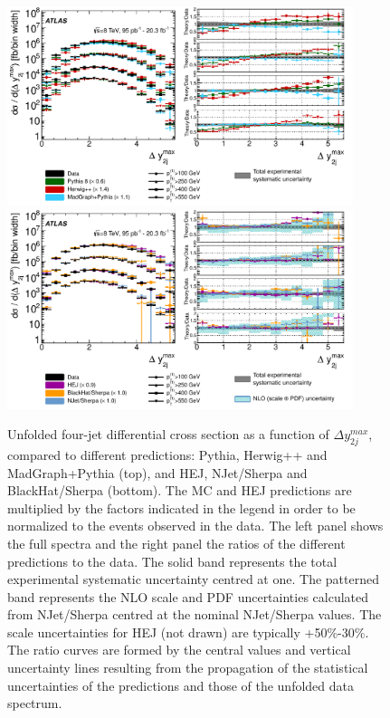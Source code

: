 \documentclass{PoS}
\begin{document}
\begin{figure}[hbpt]
  \centering
  \includegraphics[width=0.9\textwidth]{Figure6a.pdf}\\
  \includegraphics[width=0.9\textwidth]{Figure6b.pdf}
  \caption{Unfolded four-jet differential cross section as a function of $\Delta y_{2j}^{max}$, compared to different
    predictions: Pythia, Herwig++ and MadGraph+Pythia (top), and HEJ, NJet/Sherpa and BlackHat/Sherpa (bottom). The MC
    and HEJ predictions are multiplied by the factors indicated in the legend in order to be normalized to the events observed in the data. The left 
    panel shows the full spectra and the right panel the ratios of the different predictions to the data. The solid band represents the total experimental systematic
    uncertainty centred at one. The patterned band represents the NLO scale and PDF uncertainties calculated from
    NJet/Sherpa centred at the nominal NJet/Sherpa values. The scale uncertainties for HEJ (not drawn) are typically
    +50\%-30\%. The ratio curves are formed by the central values and vertical uncertainty lines resulting from the
    propagation of the statistical uncertainties of the predictions and those of the unfolded data spectrum.} 
  \label{fig:4jet}
\end{figure}
\end{document}
